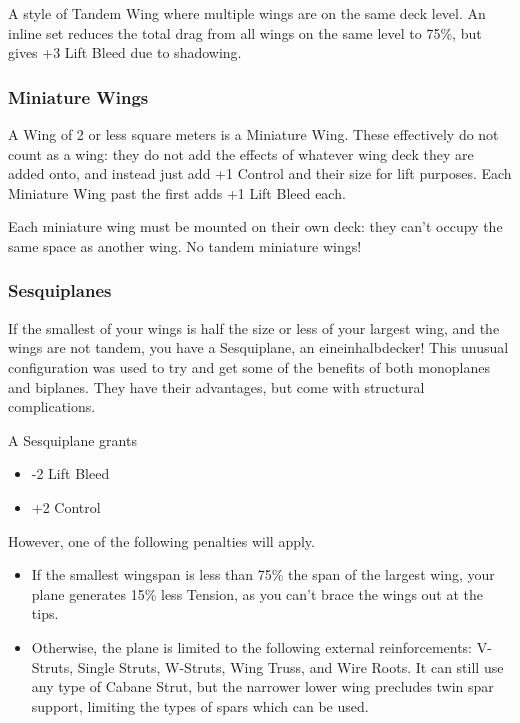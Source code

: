 \documentclass{article}
\begin{document}
A style of Tandem Wing where multiple wings are on the same deck level.
An inline set reduces the total drag from all wings on the same level to
75\%, but gives +3 Lift Bleed due to shadowing.

\subsubsection{Miniature Wings}
\label{_Miniature Wings}

A Wing of 2 or less square meters is a Miniature Wing. These effectively
do not count as a wing: they do not add the effects of whatever wing
deck they are added onto, and instead just add +1 Control and their size
for lift purposes. Each Miniature Wing past the first adds +1 Lift Bleed
each.

Each miniature wing must be mounted on their own deck: they can't occupy
the same space as another wing. No tandem miniature wings!

\subsubsection{Sesquiplanes}
\label{_Sesquiplanes}

If the smallest of your wings is half the size or less of your largest
wing, and the wings are not tandem, you have a Sesquiplane, an
eineinhalbdecker! This unusual configuration was used to try and get
some of the benefits of both monoplanes and biplanes. They have their
advantages, but come with structural complications.

A Sesquiplane grants

\begin{itemize}
  \item          -2 Lift Bleed
  \item          +2 Control
\end{itemize}

However, one of the following penalties will apply.

\begin{itemize}
  \item          If the smallest wingspan is less than 75\% the span of the
        largest wing, your plane generates 15\% less Tension, as you can't
        brace the wings out at the tips.
  \item          Otherwise, the plane is limited to the following external
        reinforcements: V-Struts, Single Struts, W-Struts, Wing Truss, and
        Wire Roots. It can still use any type of Cabane Strut, but the
        narrower lower wing precludes twin spar support, limiting the types of
        spars which can be used.
\end{itemize}
\end{document}
